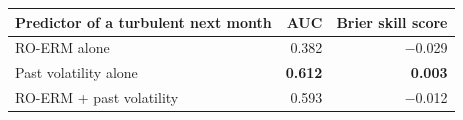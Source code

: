 \begin{tabular}{lrr}
\toprule
Predictor of a turbulent next month & AUC & Brier skill score \\
\midrule
RO-ERM alone & 0.382 & $-$0.029 \\
Past volatility alone & \textbf{0.612} & \textbf{0.003} \\
RO-ERM + past volatility & 0.593 & $-$0.012 \\
\bottomrule
\end{tabular}
